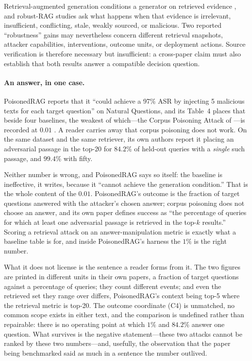 \documentclass[11pt]{article}
\begin{document}
Retrieval-augmented generation conditions a generator on retrieved evidence
\citep{lewis2020rag,dpr2020,realm2020}, and robust-RAG studies ask what happens
when that evidence is irrelevant, insufficient, conflicting, stale, weakly
sourced, or malicious. Two reported ``robustness'' gains may nevertheless
concern different retrieval snapshots, attacker capabilities, interventions,
outcome units, or deployment actions. Source verification is therefore
necessary but insufficient: a cross-paper claim must also establish that both
results answer a compatible decision question.

\paragraph{An answer, in one case.}
PoisonedRAG reports that it ``could achieve a 97\% ASR by injecting 5 malicious
texts for each target question'' on Natural Questions, and its Table~4 places
that beside four baselines, the weakest of which---the Corpus Poisoning Attack
of \citet{poisoningRetrievalCorpora2023}---is recorded at $0.01$
\citep{poisonedRAG2024}. A reader carries away that corpus poisoning does not
work. On the same dataset and the same retriever, its own authors report it
placing an adversarial passage in the top-20 for $84.2\%$ of held-out queries
with a \emph{single} such passage, and $99.4\%$ with fifty.

Neither number is wrong, and PoisonedRAG says so itself: the baseline is
ineffective, it writes, because it ``cannot achieve the generation condition.''
That is the whole content of the $0.01$. PoisonedRAG's outcome is the fraction
of target questions answered with the attacker's chosen answer; corpus
poisoning does not choose an answer, and its own paper defines success as ``the
percentage of queries for which at least one adversarial passage is retrieved in
the top-$k$ results.'' Scoring a retrieval attack on an answer-manipulation
metric is exactly what a baseline table is for, and inside PoisonedRAG's harness
the $1\%$ is the right number.

What it does not license is the sentence a reader forms from it. The two figures
are printed in different units in their own papers, a fraction of target
questions against a percentage of queries; they count different events; and even
the retrieved set they range over differs, PoisonedRAG's context being top-5
where the retrieval metric is top-20. The outcome coordinate (C4) is unmatched,
no common scope exists in either text, and the comparison is undefined rather
than repairable: there is no operating point at which $1\%$ and $84.2\%$ answer
one question. What survives is the negative statement---these two attacks cannot
be ranked by these two numbers---and, usefully, the observation that the paper
being benchmarked said as much in a sentence the number outlived.
\end{document}
